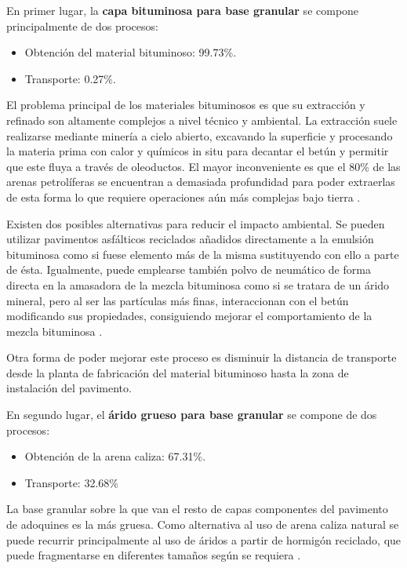 En primer lugar, la \textbf{capa bituminosa para base granular} se compone principalmente de dos procesos:
\begin{itemize}
  \item Obtención del material bituminoso: 99.73\%.
  \item Transporte: 0.27\%.
\end{itemize}

El problema principal de los materiales bituminosos es que su extracción y refinado son altamente complejos a nivel técnico y ambiental. La extracción suele realizarse mediante minería a cielo abierto, excavando la superficie y procesando la materia prima con calor y químicos in situ para decantar el betún y permitir que este fluya a través de oleoductos. El mayor inconveniente es que el 80\% de las arenas petrolíferas se encuentran a demasiada profundidad para poder extraerlas de esta forma lo que requiere operaciones aún más complejas bajo tierra \cite{eurobitume}.

Existen dos posibles alternativas para reducir el impacto ambiental. Se pueden utilizar pavimentos asfálticos reciclados añadidos directamente a la emulsión bituminosa como si fuese elemento más de la misma sustituyendo con ello a parte de ésta. Igualmente, puede emplearse también polvo de neumático de forma directa en la amasadora de la mezcla bituminosa como si se tratara de un árido mineral, pero al ser las partículas más finas, interaccionan con el betún modificando sus propiedades, consiguiendo mejorar el comportamiento de la mezcla bituminosa \cite{polvocaucho}.

Otra forma de poder mejorar este proceso es disminuir la distancia de transporte desde la planta de fabricación del material bituminoso hasta la zona de instalación del pavimento.

En segundo lugar, el \textbf{árido grueso para base granular} se compone de dos procesos:
\begin{itemize}
  \item Obtención de la arena caliza: 67.31\%.
  \item Transporte: 32.68\%
\end{itemize}

La base granular sobre la que van el resto de capas componentes del pavimento de adoquines es la más gruesa. Como alternativa al uso de arena caliza natural se puede recurrir principalmente al uso de áridos a partir de hormigón reciclado, que puede fragmentarse en diferentes tamaños según se requiera \cite{monografia}.


